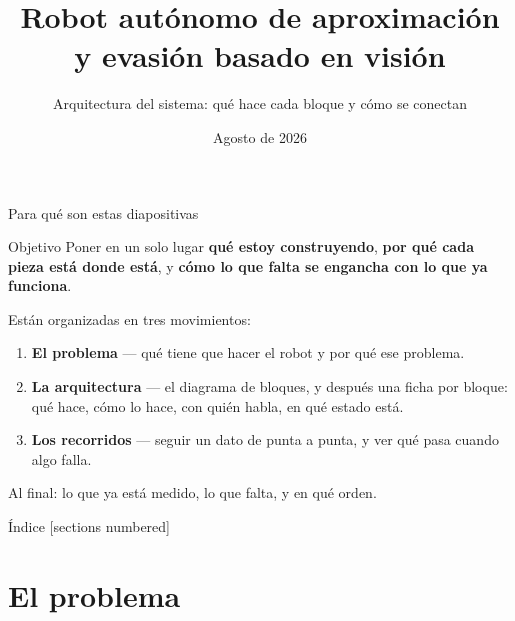 \documentclass[aspectratio=169,10pt]{beamer}
\title{Robot autónomo de aproximación y evasión basado en visión}
\subtitle{Arquitectura del sistema: qué hace cada bloque y cómo se conectan}
\author{\autornombre}
\institute{TPF --- IA aplicada a la Robótica \\ Maestría en Inteligencia Artificial}
\date{Agosto de 2026}
\newcommand{\destaca}[1]{\textcolor{azul}{\textbf{#1}}}
\begin{document}
\maketitle

\begin{frame}{Para qué son estas diapositivas}
  \begin{block}{Objetivo}
    Poner en un solo lugar \destaca{qué estoy construyendo}, \destaca{por qué cada
    pieza está donde está}, y \destaca{cómo lo que falta se engancha con lo que
    ya funciona}.
  \end{block}

  \vspace{0.4em}
  Están organizadas en tres movimientos:

  \begin{enumerate}
    \item \textbf{El problema} --- qué tiene que hacer el robot y por qué ese problema.
    \item \textbf{La arquitectura} --- el diagrama de bloques, y después una ficha
          por bloque: qué hace, cómo lo hace, con quién habla, en qué estado está.
    \item \textbf{Los recorridos} --- seguir un dato de punta a punta, y ver qué
          pasa cuando algo falla.
  \end{enumerate}

  \vspace{0.4em}
  Al final: lo que ya está medido, lo que falta, y en qué orden.
\end{frame}

\begin{frame}{Índice}
  [sections numbered]
  {\footnotesize\tableofcontents[hideallsubsections]}
\end{frame}

\section{El problema}
\end{document}
